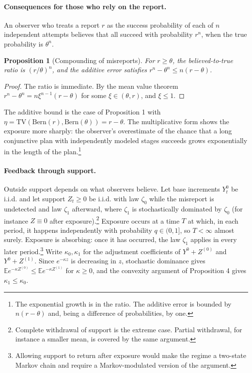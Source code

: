 \documentclass[11pt]{article}
\newtheorem{proposition}{Proposition}
\theoremstyle{remark}
\newcommand{\E}{\mathbb{E}}
\newcommand{\tv}{\mathrm{TV}}
\begin{document}
\paragraph{Consequences for those who rely on the report.} An observer who treats a report $r$ as the success probability of each of $n$ independent attempts believes that all succeed with probability $r^n$, when the true probability is $\theta^n$.

\begin{proposition}[Compounding of misreports]
For $r\ge\theta$, the believed-to-true ratio is $(r/\theta)^n$, and the additive error satisfies $r^n-\theta^n\le n(r-\theta)$.
\end{proposition}

\begin{proof}
The ratio is immediate. By the mean value theorem $r^n-\theta^n=n\xi^{n-1}(r-\theta)$ for some $\xi\in(\theta,r)$, and $\xi\le1$.
\end{proof}

The additive bound is the case of Proposition 1 with $\eta=\tv(\mathrm{Bern}(r),\mathrm{Bern}(\theta))=r-\theta$. The multiplicative form shows the exposure more sharply: the observer's overestimate of the chance that a long conjunctive plan with independently modeled stages succeeds grows exponentially in the length of the plan.\footnote{The exponential growth is in the ratio. The additive error is bounded by $n(r-\theta)$ and, being a difference of probabilities, by one.}

\paragraph{Feedback through support.} Outside support depends on what observers believe. Let base increments $Y^0_t$ be i.i.d. and let support $Z_t\ge0$ be i.i.d. with law $\zeta_0$ while the misreport is undetected and law $\zeta_1$ afterward, where $\zeta_1$ is stochastically dominated by $\zeta_0$ (for instance $Z\equiv0$ after exposure).\footnote{Complete withdrawal of support is the extreme case. Partial withdrawal, for instance a smaller mean, is covered by the same argument.} Exposure occurs at a time $T$ at which, in each period, it happens independently with probability $q\in(0,1]$, so $T<\infty$ almost surely. Exposure is absorbing: once it has occurred, the law $\zeta_1$ applies in every later period.\footnote{Allowing support to return after exposure would make the regime a two-state Markov chain and require a Markov-modulated version of the argument.} Write $\kappa_0,\kappa_1$ for the adjustment coefficients of $Y^0+Z^{(0)}$ and $Y^0+Z^{(1)}$. Since $e^{-\kappa z}$ is decreasing in $z$, stochastic dominance gives $\E e^{-\kappa Z^{(0)}}\le\E e^{-\kappa Z^{(1)}}$ for $\kappa\ge0$, and the convexity argument of Proposition 4 gives $\kappa_1\le\kappa_0$.
\end{document}
